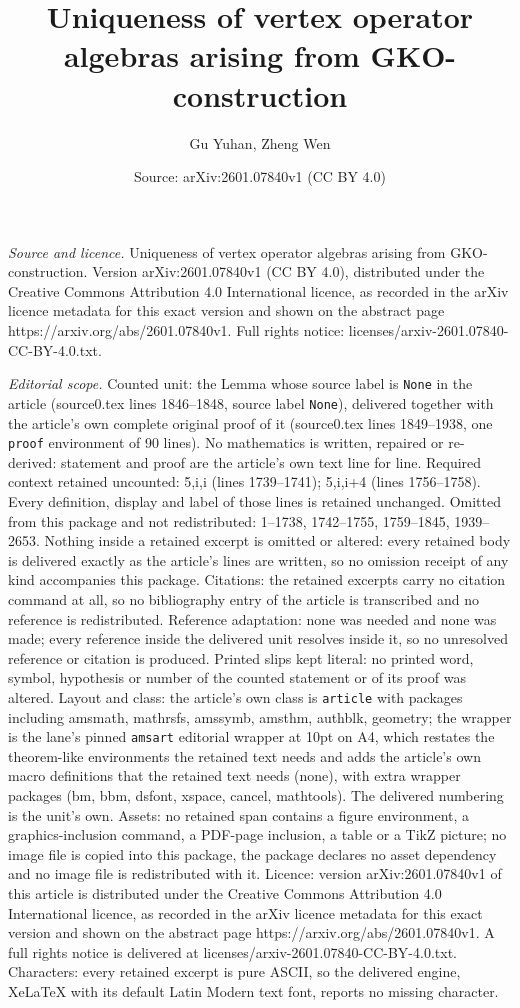 \documentclass[10pt,a4paper]{amsart}
\title[Uniqueness of vertex operator algebras arising from GKO-cons]{Uniqueness of vertex operator algebras arising from GKO-construction}
\author{Gu Yuhan, Zheng Wen}
\date{Source: arXiv:2601.07840v1 (CC BY 4.0)}
\begin{document}
\maketitle

\noindent\emph{Source and licence.} Uniqueness of vertex operator algebras arising from GKO-construction. Version arXiv:2601.07840v1 (CC BY 4.0), distributed under the Creative Commons Attribution 4.0 International licence, as recorded in the arXiv licence metadata for this exact version and shown on the abstract page https://arxiv.org/abs/2601.07840v1. Full rights notice: licenses/arxiv-2601.07840-CC-BY-4.0.txt.\par\smallskip

\noindent\textit{Editorial scope.} Counted unit: the Lemma whose source label is \texttt{None} in the article (source0.tex lines 1846--1848, source label \texttt{None}), delivered together with the article's own complete original proof of it (source0.tex lines 1849--1938, one \texttt{proof} environment of 90 lines). No mathematics is written, repaired or re-derived: statement and proof are the article's own text line for line. Required context retained uncounted: 5,i,i (lines 1739--1741); 5,i,i+4 (lines 1756--1758). Every definition, display and label of those lines is retained unchanged. Omitted from this package and not redistributed: 1--1738, 1742--1755, 1759--1845, 1939--2653. Nothing inside a retained excerpt is omitted or altered: every retained body is delivered exactly as the article's lines are written, so no omission receipt of any kind accompanies this package. Citations: the retained excerpts carry no citation command at all, so no bibliography entry of the article is transcribed and no reference is redistributed. Reference adaptation: none was needed and none was made; every reference inside the delivered unit resolves inside it, so no unresolved reference or citation is produced. Printed slips kept literal: no printed word, symbol, hypothesis or number of the counted statement or of its proof was altered. Layout and class: the article's own class is \texttt{article} with packages including amsmath, mathrsfs, amssymb, amsthm, authblk, geometry; the wrapper is the lane's pinned \texttt{amsart} editorial wrapper at 10pt on A4, which restates the theorem-like environments the retained text needs and adds the article's own macro definitions that the retained text needs (none), with extra wrapper packages (bm, bbm, dsfont, xspace, cancel, mathtools). The delivered numbering is the unit's own. Assets: no retained span contains a figure environment, a graphics-inclusion command, a PDF-page inclusion, a table or a TikZ picture; no image file is copied into this package, the package declares no asset dependency and no image file is redistributed with it. Licence: version arXiv:2601.07840v1 of this article is distributed under the Creative Commons Attribution 4.0 International licence, as recorded in the arXiv licence metadata for this exact version and shown on the abstract page https://arxiv.org/abs/2601.07840v1. A full rights notice is delivered at licenses/arxiv-2601.07840-CC-BY-4.0.txt. Characters: every retained excerpt is pure ASCII, so the delivered engine, XeLaTeX with its default Latin Modern text font, reports no missing character.
\end{document}
